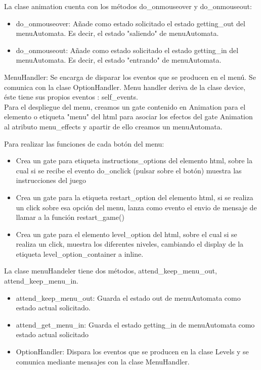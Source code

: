 La clase animation cuenta con los métodos do\_onmouseover y do\_onmouseout:
\begin{itemize}
 \item do\_onmouseover: Añade como estado solicitado el estado getting\_out del menuAutomata.
Es decir, el estado "saliendo" de menuAutomata.

 \item do\_onmouseout: Añade como estado solicitado el estado getting\_in del menuAutomata.
Es decir, el estado "entrando" de menuAutomata.
\end{itemize}

MenuHandler: Se encarga de disparar los eventos que se producen en el menú. Se comunica con la clase OptionHandler.
Menu handler deriva de la clase device, éste  tiene sus propios eventos : self\_events.\\

Para el despliegue del menu, creamos un gate contenido en Animation para el elemento o etiqueta "menu" del html para asociar los efectos del 
gate Animation al atributo menu\_effects y apartir de ello creamos un menuAutomata.

Para realizar las funciones de cada botón del menu:
\begin{itemize}
 \item Crea un gate  para etiqueta instructions\_options del elemento html, sobre la cual si se recibe el 
evento do\_onclick (pulsar sobre el botón) muestra las instrucciones del juego

 \item Crea un gate para la etiqueta restart\_option del elemento html, si se realiza un click sobre esa opción del menu, lanza como evento el envio 
de mensaje de llamar a la función restart\_game()

 \item Crea un gate para el elemento level\_option del html, sobre el cual si se realiza un click,
muestra los diferentes niveles, cambiando el display de la etiqueta level\_option\_container a inline.
\end{itemize}

La clase menuHandeler tiene dos métodos, attend\_keep\_menu\_out, attend\_keep\_menu\_in.
\begin{itemize}
 \item attend\_keep\_menu\_out: Guarda el estado out de menuAutomata como estado actual solicitado.

 \item attend\_get\_menu\_in: Guarda el estado getting\_in de menuAutomata como estado actual solicitado

 \item OptionHandler: Dispara los eventos que se producen en la clase Levels y se comunica mediante mensajes con la clase MenuHandler.
\end{itemize}

